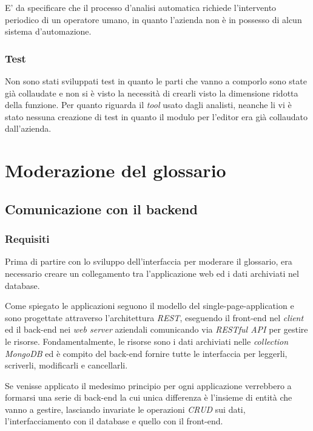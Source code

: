 E' da specificare che il processo d'analisi automatica richiede l'intervento
periodico di un operatore umano, in quanto l'azienda non è in possesso di alcun
sistema d'automazione.

\subsubsection{Test}
Non sono stati sviluppati test in quanto le parti che vanno a comporlo sono
state già collaudate e non si è visto la necessità di crearli visto la
dimensione ridotta della funzione. Per quanto riguarda il \textit{tool} usato
dagli analisti, neanche li vi è stato nessuna creazione di test in quanto il
modulo per l'editor era già collaudato dall'azienda.
%

\section{Moderazione del glossario}
\label{sec:glossary}
\subsection{Comunicazione con il backend}
\subsubsection{Requisiti}
Prima di partire con lo sviluppo dell'interfaccia per moderare il glossario, era
necessario creare un collegamento tra l'applicazione web ed i dati archiviati
nel database.

Come spiegato le applicazioni seguono il modello del
\gls{single-page-application} e sono progettate attraverso l'architettura
\textit{REST}, eseguendo il \gls{front-end} nel \textit{client} ed il
\gls{back-end} nei \textit{web server} aziendali comunicando via
\textit{RESTful API} per gestire le risorse. Fondamentalmente, le risorse sono i
dati archiviati nelle \textit{collection MongoDB} ed è compito del
\gls{back-end} fornire tutte le interfaccia per leggerli, scriverli, modificarli
e cancellarli.

Se venisse applicato il medesimo principio per ogni applicazione
verrebbero a formarsi una serie di \gls{back-end} la cui unica differenza è
l'insieme di entità che vanno a gestire, lasciando invariate le operazioni
\textit{CRUD} sui dati, l'interfacciamento con il database e quello con il
\gls{front-end}.

